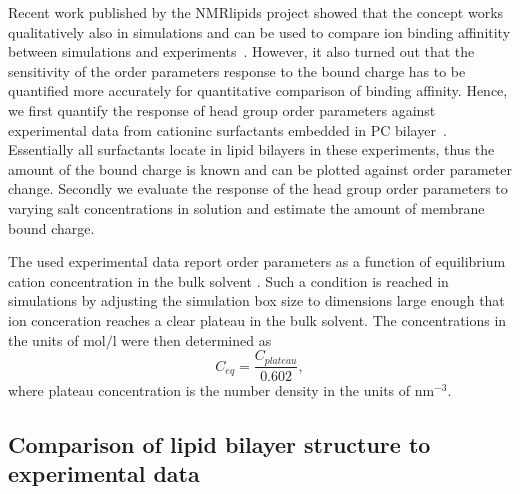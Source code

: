 \documentclass[aip,jcp,twocolumn]{revtex4}
\begin{document}
Recent work published by the NMRlipids project showed that the concept works
qualitatively also in simulations and can be used to compare ion binding
affinitity between simulations and experiments~\cite{catte16}. However,
it also turned out that the sensitivity of the order parameters response
to the bound charge has to be quantified more accurately for quantitative comparison
of binding affinity. Hence, we first quantify the response of
head group order parameters against experimental data from cationinc surfactants
embedded in PC bilayer~\cite{scherer89}. Essentially all surfactants locate in
lipid bilayers in these experiments, thus the amount of the bound charge is known
and can be plotted against order parameter change.
Secondly we evaluate the response of the head group order parameters to varying salt concentrations in solution
and estimate the amount of membrane bound charge. 



The used experimental data report order parameters as a function of
equilibrium cation concentration in the bulk solvent \cite{akutsu81,altenbach84}.
Such a condition is reached in simulations by adjusting
the simulation box size to dimensions large enough
that ion conceration reaches a clear plateau in the bulk solvent.
The concentrations in the units of $\mathrm{mol/l}$ were then 
determined as
\begin{equation}
  C_{eq}=\frac{C_{plateau}}{0.602},
\end{equation}
where plateau concentration is the number density in the units of $\mathrm{nm}^{-3}$.

\subsection{Comparison of lipid bilayer structure to experimental data}
\end{document}
